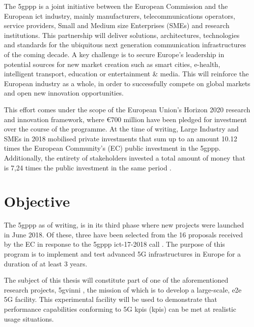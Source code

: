 
The \acrfull{5gppp} is a joint initiative between the European Commission and the European \acrfull{ict} industry, mainly manufacturers, telecommunications operators, service providers, Small and Medium size Enterprises (SMEs) and research institutions. This partnership will deliver solutions, architectures, technologies and standards for the ubiquitous next generation communication infrastructures of the coming decade. A key challenge is to secure Europe’s leadership in potential sources for new market creation such as smart cities, e-health, intelligent transport, education or entertainment \& media. This will reinforce the European industry as a whole, in order to successfully compete on global markets and open new innovation opportunities.

This effort  comes under the scope of the European Union's Horizon 2020 research and innovation framework, where \euro 700 million \cite{alessandro_bedeschi_2018} have been pledged for investment over the course of the programme. At the time of writing, Large Industry and SMEs in 2018 mobilised private investments that sum up to an amount 10.12 times the European Community's (EC) public investment in the \acrshort{5gppp}. Additionally, the entirety of stakeholders invested a total amount of money that is 7,24 times the public investment in the same period \cite{european_5G_journal_2020}.


\section{Objective}
The \acrshort{5gppp} as of writing, is in its third phase where new projects were launched in June 2018. Of these, three have been selected from the  16 proposals received by the EC in response to the \acrshort{5gppp} \acrshort{ict}-17-2018 call \cite{ict-17-2018}. The purpose of this program is to implement and test advanced 5G infrastructures in Europe for a duration of at least 3 years.

The subject of this thesis will constitute part of one of the aforementioned research projects, \acrfull{5gvinni} \cite{5gvinni-site}, the mission of which is to develop a large-scale, \acrfull{e2e} 5G facility. This experimental facility will be used to demonstrate that performance capabilities conforming to 5G \acrlong{kpi}s (\acrshort{kpi}s) can be met at realistic usage situations. 

